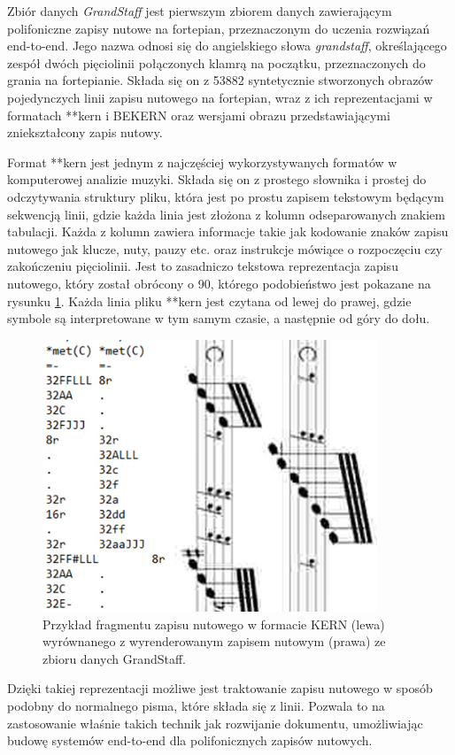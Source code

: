 Zbiór danych \textit{GrandStaff} jest pierwszym zbiorem danych zawierającym polifoniczne zapisy nutowe na fortepian, przeznaczonym do uczenia rozwiązań end-to-end. Jego nazwa odnosi się do angielskiego słowa \textit{grandstaff}, określającego zespół dwóch pięciolinii połączonych klamrą na początku, przeznaczonych do grania na fortepianie.
Składa się on z 53882 syntetycznie stworzonych obrazów pojedynczych linii zapisu nutowego na fortepian, wraz z ich reprezentacjami w formatach **kern i BEKERN oraz wersjami obrazu przedstawiającymi zniekształcony zapis nutowy.

Format **kern jest jednym z najczęściej wykorzystywanych formatów w komputerowej analizie muzyki. Składa się on z prostego słownika i prostej do odczytywania struktury pliku, która jest po prostu zapisem tekstowym będącym sekwencją linii, gdzie każda linia jest złożona z kolumn odseparowanych znakiem tabulacji. Każda z kolumn zawiera informacje takie jak kodowanie znaków zapisu nutowego jak klucze, nuty, pauzy etc. oraz instrukcje mówiące o rozpoczęciu czy zakończeniu pięciolinii. Jest to zasadniczo tekstowa reprezentacja zapisu nutowego, który został obrócony o 90\degree, którego podobieństwo jest pokazane na rysunku \ref{fig:kern-score}. Każda linia pliku **kern jest czytana od lewej do prawej, gdzie symbole są interpretowane w tym samym czasie, a następnie od góry do dołu.

\begin{figure}
	\centering
	\includegraphics[width=10cm]{images/kern-nuty.jpg}
	\caption{Przykład fragmentu zapisu nutowego w formacie KERN (lewa) wyrównanego z wyrenderowanym zapisem nutowym (prawa) ze zbioru danych GrandStaff.}
	\label{fig:kern-score}
\end{figure}

Dzięki takiej reprezentacji możliwe jest traktowanie zapisu nutowego w sposób podobny do normalnego pisma, które składa się z linii. Pozwala to na zastosowanie właśnie takich technik jak rozwijanie dokumentu\cite{Coquenet2021}, umożliwiając budowę systemów end-to-end dla polifonicznych zapisów nutowych.

